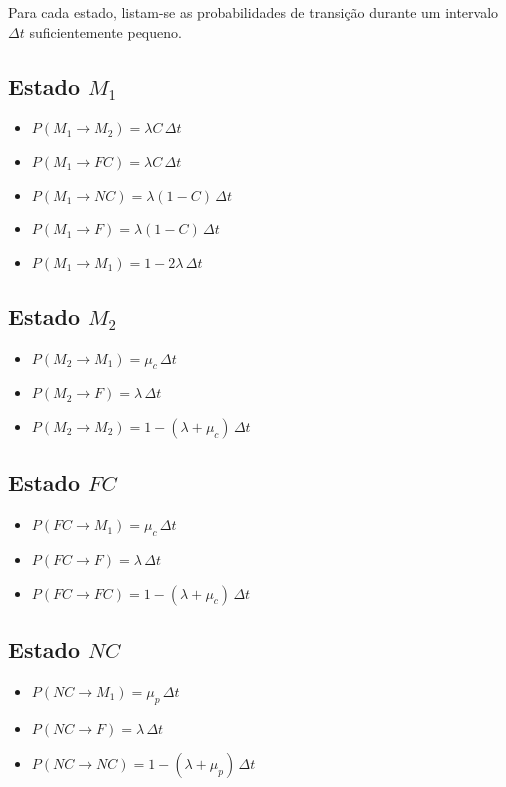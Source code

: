 \documentclass[12pt]{article}
\begin{document}
Para cada estado, listam-se as probabilidades de transição durante um
intervalo $\Delta t$ suficientemente pequeno.

\subsection*{Estado $M_1$}
\begin{itemize}
    \item $P(M_1 \to M_2)   = \lambda C \,\Delta t$
    \item $P(M_1 \to FC)    = \lambda C \,\Delta t$
    \item $P(M_1 \to NC)    = \lambda (1-C)\,\Delta t$
    \item $P(M_1 \to F)     = \lambda (1-C)\,\Delta t$
    \item $P(M_1 \to M_1)   = 1 - 2\lambda\,\Delta t$
\end{itemize}

\subsection*{Estado $M_2$}
\begin{itemize}
    \item $P(M_2 \to M_1) = \mu_c\,\Delta t$
    \item $P(M_2 \to F)   = \lambda\,\Delta t$
    \item $P(M_2 \to M_2) = 1 - (\lambda + \mu_c)\,\Delta t$
\end{itemize}

\subsection*{Estado $FC$}
\begin{itemize}
    \item $P(FC \to M_1) = \mu_c\,\Delta t$
    \item $P(FC \to F)   = \lambda\,\Delta t$
    \item $P(FC \to FC)  = 1 - (\lambda + \mu_c)\,\Delta t$
\end{itemize}

\subsection*{Estado $NC$}
\begin{itemize}
    \item $P(NC \to M_1) = \mu_p\,\Delta t$
    \item $P(NC \to F)   = \lambda\,\Delta t$
    \item $P(NC \to NC)  = 1 - (\lambda + \mu_p)\,\Delta t$
\end{itemize}
\end{document}
